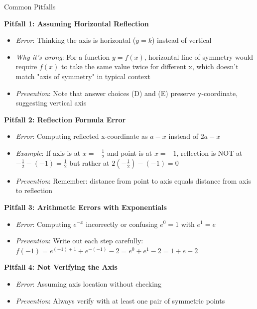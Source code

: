 \documentclass[12pt]{article}
\begin{document}
\begin{warningbox}{Common Pitfalls}

\textbf{Pitfall 1: Assuming Horizontal Reflection}
\begin{itemize}
    \item \textit{Error}: Thinking the axis is horizontal ($y = k$) instead of vertical
    \item \textit{Why it's wrong}: For a function $y = f(x)$, horizontal line of symmetry would require $f(x)$ to take the same value twice for different x, which doesn't match "axis of symmetry" in typical context
    \item \textit{Prevention}: Note that answer choices (D) and (E) preserve y-coordinate, suggesting vertical axis
\end{itemize}

\textbf{Pitfall 2: Reflection Formula Error}
\begin{itemize}
    \item \textit{Error}: Computing reflected x-coordinate as $a - x$ instead of $2a - x$
    \item \textit{Example}: If axis is at $x = -\frac{1}{2}$ and point is at $x = -1$, reflection is NOT at $-\frac{1}{2} - (-1) = \frac{1}{2}$ but rather at $2(-\frac{1}{2}) - (-1) = 0$
    \item \textit{Prevention}: Remember: distance from point to axis equals distance from axis to reflection
\end{itemize}

\textbf{Pitfall 3: Arithmetic Errors with Exponentials}
\begin{itemize}
    \item \textit{Error}: Computing $e^{-x}$ incorrectly or confusing $e^0 = 1$ with $e^1 = e$
    \item \textit{Prevention}: Write out each step carefully: $f(-1) = e^{(-1)+1} + e^{-(-1)} - 2 = e^0 + e^1 - 2 = 1 + e - 2$
\end{itemize}

\textbf{Pitfall 4: Not Verifying the Axis}
\begin{itemize}
    \item \textit{Error}: Assuming axis location without checking
    \item \textit{Prevention}: Always verify with at least one pair of symmetric points
\end{itemize}

\end{warningbox}
\end{document}
